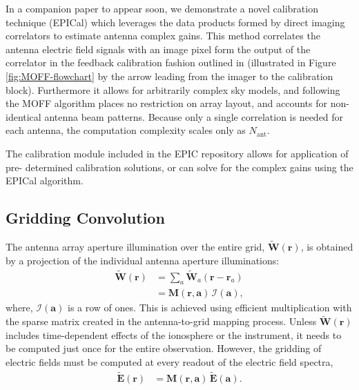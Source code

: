 \documentclass[a4paper,fleqn,usenatbib]{../mnras}
\begin{document}
In a companion paper to appear soon, we demonstrate a novel calibration 
technique (EPICal) which leverages the data products formed by direct imaging 
correlators to estimate antenna complex gains. This method correlates the antenna 
electric field signals with an image pixel form the output of the correlator in the 
feedback calibration fashion outlined in \citealt{mor11} (illustrated in Figure 
\ref{fig:MOFF-flowchart} by the arrow leading from the imager to the calibration 
block). Furthermore it allows for arbitrarily complex sky models, and following the 
MOFF algorithm places no restriction on array layout, and accounts for non-identical 
antenna beam patterns. Because only a single correlation is needed for each 
antenna, the computation complexity scales only as $N_{\mathrm{ant}}$. 

The calibration module included in the EPIC repository allows for application of pre-
determined calibration solutions, or can solve for the complex gains using the 
EPICal algorithm.

\subsection{Gridding Convolution}

The antenna array aperture illumination over the entire grid,
$\widetilde{\mathbf{W}}(\mathbf{r})$, is obtained by a projection of the individual
antenna aperture illuminations:
\begin{align}\label{eqn:gridding-convolution}
  \widetilde{\mathbf{W}}(\mathbf{r}) &= \sum_a \widetilde{\mathbf{W}}_a(\mathbf{r}-\mathbf{r}_a) \\
                            &= \mathbf{M}(\mathbf{r},\mathbf{a})\,\mathcal{I}(\mathbf{a}),
\end{align}
where, $\mathcal{I}(\mathbf{a})$ is a row of ones. This is achieved using
efficient multiplication with the sparse matrix created in the antenna-to-grid
mapping process. Unless $\widetilde{\mathbf{W}}(\mathbf{r})$ includes time-dependent
effects of the ionosphere or the instrument, it needs to be computed just once
for the entire observation. However, the gridding of electric fields must be
computed at every readout of the electric field spectra,
\begin{align}
  \widetilde{\mathbf{E}}(\mathbf{r}) &= \mathbf{M}(\mathbf{r},\mathbf{a})\,\widetilde{\mathbf{E}}(\mathbf{a}).
\end{align}
\end{document}
